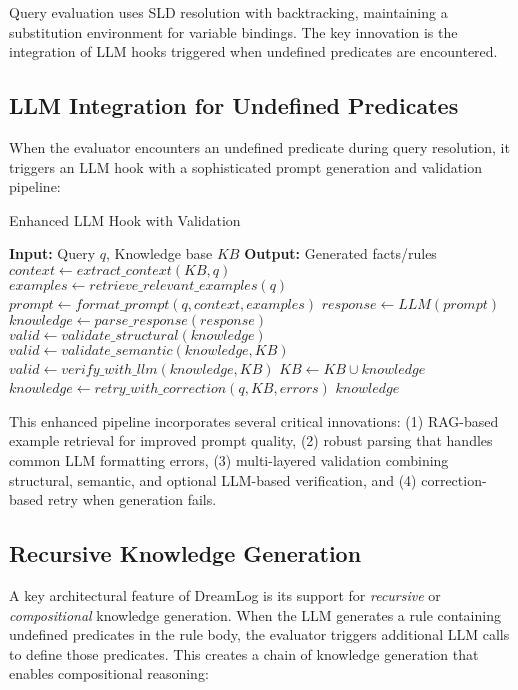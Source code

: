 \documentclass[10pt,conference]{IEEEtran}
\begin{document}
Query evaluation uses SLD resolution with backtracking, maintaining a substitution environment for variable bindings. The key innovation is the integration of LLM hooks triggered when undefined predicates are encountered.

\subsection{LLM Integration for Undefined Predicates}

When the evaluator encounters an undefined predicate during query resolution, it triggers an LLM hook with a sophisticated prompt generation and validation pipeline:

\begin{algorithm}
\caption{Enhanced LLM Hook with Validation}
\label{alg:llm_hook}
\begin{algorithmic}[1]
\STATE \textbf{Input:} Query $q$, Knowledge base $KB$
\STATE \textbf{Output:} Generated facts/rules
    \STATE $context \gets extract\_context(KB, q)$
    \STATE $examples \gets retrieve\_relevant\_examples(q)$  
    \STATE $prompt \gets format\_prompt(q, context, examples)$
    \STATE $response \gets LLM(prompt)$
    \STATE $knowledge \gets parse\_response(response)$  
    \STATE $valid \gets validate\_structural(knowledge)$
        \STATE $valid \gets validate\_semantic(knowledge, KB)$
    \ENDIF
        \STATE $valid \gets verify\_with\_llm(knowledge, KB)$
    \ENDIF
        \STATE $KB \gets KB \cup knowledge$
    \ELSE
        \STATE $knowledge \gets retry\_with\_correction(q, KB, errors)$
    \ENDIF
\ENDIF
\RETURN $knowledge$
\end{algorithmic}
\end{algorithm}

This enhanced pipeline incorporates several critical innovations: (1) RAG-based example retrieval for improved prompt quality, (2) robust parsing that handles common LLM formatting errors, (3) multi-layered validation combining structural, semantic, and optional LLM-based verification, and (4) correction-based retry when generation fails.

\subsection{Recursive Knowledge Generation}

A key architectural feature of DreamLog is its support for \textit{recursive} or \textit{compositional} knowledge generation. When the LLM generates a rule containing undefined predicates in the rule body, the evaluator triggers additional LLM calls to define those predicates. This creates a chain of knowledge generation that enables compositional reasoning:
\end{document}

